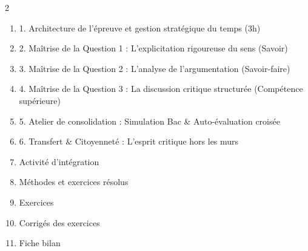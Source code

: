 \documentclass[11pt]{article}
\begin{document}
\begin{sommaire}
\begin{multicols}{2}
\begin{enumerate}
\item 1. Architecture de l'épreuve et gestion stratégique du temps (3h)
\item 2. Maîtrise de la Question 1 : L'explicitation rigoureuse du sens (Savoir)
\item 3. Maîtrise de la Question 2 : L'analyse de l'argumentation (Savoir-faire)
\item 4. Maîtrise de la Question 3 : La discussion critique structurée (Compétence supérieure)
\item 5. Atelier de consolidation : Simulation Bac \& Auto-évaluation croisée
\item 6. Transfert \& Citoyenneté : L'esprit critique hors les murs
\item Activité d'intégration
\item Méthodes et exercices résolus
\item Exercices
\item Corrigés des exercices
\item Fiche bilan
\end{enumerate}
\end{multicols}
\end{sommaire}
\end{document}
